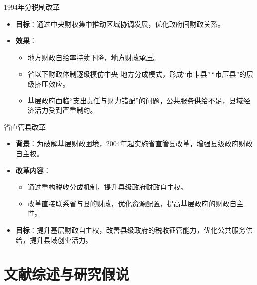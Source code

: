 \documentclass{beamer}
\newcommand{\tightlist}{%
  \setlength{\itemsep}{0pt}\setlength{\parskip}{0pt}}
\begin{document}
\begin{frame}{1994年分税制改革}
\label{ux5e74ux5206ux7a0eux5236ux6539ux9769}
\begin{itemize}
\tightlist
\item
  \textbf{目标}：通过中央财权集中推动区域协调发展，优化政府间财政关系。
\item
  \textbf{效果}：

  \begin{itemize}
  \tightlist
  \item
    地方财政自给率持续下降，地方财政承压。
  \item
    省以下财政体制逐级模仿中央-地方分成模式，形成``市卡县''\,``市压县''的层级挤压效应。
  \item
    基层政府面临``支出责任与财力错配''的问题，公共服务供给不足，县域经济活力受到严重制约。
  \end{itemize}
\end{itemize}
\end{frame}

\begin{frame}{省直管县改革}
\label{ux7701ux76f4ux7ba1ux53bfux6539ux9769}
\begin{itemize}
\tightlist
\item
  \textbf{背景}：为破解基层财政困境，2004年起实施省直管县改革，增强县级政府财政自主权。
\item
  \textbf{改革内容}：

  \begin{itemize}
  \tightlist
  \item
    通过重构税收分成机制，提升县级政府财政自主权。
  \item
    改革直接联系省与县的财政，优化资源配置，提高基层政府的财政自主性。
  \end{itemize}
\item
  \textbf{目标}：提升基层财政自主权，改善县级政府的税收征管能力，优化公共服务供给，提升县域创业活力。
\end{itemize}
\end{frame}

\section{文献综述与研究假说}\label{ux6587ux732eux7efcux8ff0ux4e0eux7814ux7a76ux5047ux8bf4}
\end{document}
